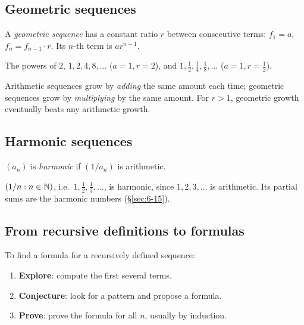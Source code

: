\subsection{Geometric sequences}
\label{sec:6-4}

\begin{definition}
A \emph{geometric sequence} has a constant ratio $r$ between consecutive terms: $f_1=a$, $f_n=f_{n-1}\cdot r$. Its $n$-th term is $ar^{n-1}$.
\end{definition}

\begin{example}
The powers of $2$, $1,2,4,8,\dots$ ($a=1,r=2$), and $1,\frac12,\frac14,\frac18,\dots$ ($a=1,r=\frac12$).
\end{example}

\begin{note}
Arithmetic sequences grow by \emph{adding} the same amount each time; geometric sequences grow by \emph{multiplying} by the same amount. For $r>1$, geometric growth eventually beats any arithmetic growth.
\end{note}

\subsection{Harmonic sequences}
\label{sec:6-5}

\begin{definition}
$(a_n)$ is \emph{harmonic} if $(1/a_n)$ is arithmetic.
\end{definition}

\begin{example}
$(1/n : n\in\mathbb{N})$, i.e.\ $1,\frac12,\frac13,\dots$, is harmonic, since $1,2,3,\dots$ is arithmetic. Its partial sums are the harmonic numbers (\S\ref{sec:6-15}).
\end{example}

\subsection{From recursive definitions to formulas}
\label{sec:6-6}

\begin{note}
To find a formula for a recursively defined sequence:
\begin{enumerate}[label=\arabic*.]
    \item \textbf{Explore}: compute the first several terms.
    \item \textbf{Conjecture}: look for a pattern and propose a formula.
    \item \textbf{Prove}: prove the formula for all $n$, usually by induction.
\end{enumerate}
\end{note}

